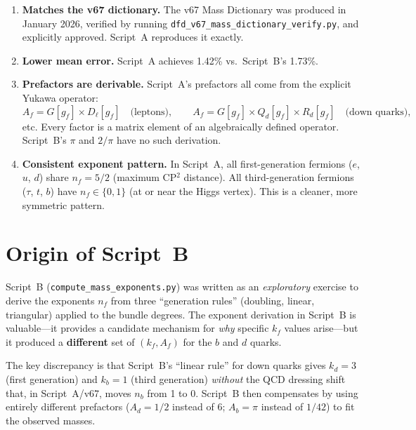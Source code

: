 \documentclass[11pt,a4paper]{article}
\begin{document}
\begin{enumerate}
\item \textbf{Matches the v67 dictionary.}
  The v67 Mass Dictionary was produced in January 2026, verified by running
  \texttt{dfd\_v67\_mass\_dictionary\_verify.py}, and explicitly approved.
  Script~A reproduces it exactly.

\item \textbf{Lower mean error.}
  Script~A achieves 1.42\% vs.\ Script~B's 1.73\%.

\item \textbf{Prefactors are derivable.}
  Script~A's prefactors all come from the explicit Yukawa operator:
  \[
  A_f = G[g_f] \times D_\ell[g_f] \quad\text{(leptons)}, \qquad
  A_f = G[g_f] \times Q_d[g_f] \times R_d[g_f] \quad\text{(down quarks)},
  \]
  etc.  Every factor is a matrix element of an algebraically defined operator.
  Script~B's $\pi$ and $2/\pi$ have no such derivation.

\item \textbf{Consistent exponent pattern.}
  In Script~A, all first-generation fermions ($e$, $u$, $d$) share $n_f = 5/2$
  (maximum CP$^2$ distance).  All third-generation fermions ($\tau$, $t$, $b$)
  have $n_f \in \{0, 1\}$ (at or near the Higgs vertex).  This is a
  cleaner, more symmetric pattern.
\end{enumerate}

\section{Origin of Script~B}
\label{sec:origin}

Script~B (\texttt{compute\_mass\_exponents.py}) was written as an
\emph{exploratory} exercise to derive the exponents $n_f$ from three
``generation rules'' (doubling, linear, triangular) applied to the
bundle degrees.  The exponent derivation in Script~B is valuable---it
provides a candidate mechanism for \emph{why} specific $k_f$ values
arise---but it produced a \textbf{different} set of $(k_f, A_f)$ for
the $b$ and $d$ quarks.

The key discrepancy is that Script~B's ``linear rule'' for down quarks
gives $k_d = 3$ (first generation) and $k_b = 1$ (third generation)
\emph{without} the QCD dressing shift that, in Script~A/v67, moves
$n_b$ from 1 to 0.  Script~B then compensates by using entirely different
prefactors ($A_d = 1/2$ instead of $6$; $A_b = \pi$ instead of $1/42$)
to fit the observed masses.
\end{document}
